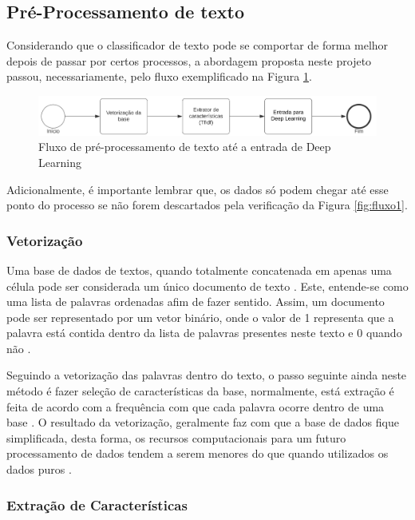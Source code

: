 \documentclass[12pt]{article}
\begin{document}
\subsection{Pré-Processamento de texto}\label{sec:proccess}

Considerando que o classificador de texto pode se comportar de forma melhor depois de passar por certos processos, a abordagem proposta neste projeto passou, necessariamente, pelo fluxo exemplificado na Figura \ref{fig:fluxo2}. 

\begin{figure}[ht]
\centering
\includegraphics[scale=0.25]{fig/fluxo2.png}
\caption{Fluxo de pré-processamento de texto até a entrada de Deep Learning}
\label{fig:fluxo2}
\end{figure}

Adicionalmente, é importante lembrar que, os dados só podem chegar até esse ponto do processo se não forem descartados pela verificação da Figura \ref{fig:fluxo1}.

\subsubsection{Vetorização}\label{sec:vector}

Uma base de dados de textos, quando totalmente concatenada em apenas uma célula pode ser considerada um único documento de texto \cite{klopotek:03}. Este, entende-se como uma lista de palavras ordenadas afim de fazer sentido. Assim, um documento pode ser representado por um vetor binário, onde o valor de 1 representa que a palavra está contida dentro da lista de palavras presentes neste texto e 0 quando não \cite{ikonomakis:05}.   

Seguindo a vetorização das palavras dentro do texto, o passo seguinte ainda neste método é fazer seleção de características da base, normalmente, está extração é feita de acordo com a frequência com que cada palavra ocorre dentro de uma base \cite{zhang:05}. O resultado da vetorização, geralmente faz com que a base de dados fique simplificada, desta forma, os recursos computacionais para um futuro processamento de dados tendem a serem menores do que quando utilizados os dados puros \cite{ikonomakis:05}.

\subsubsection{Extração de Características}\label{sec:tfidf}
\end{document}
